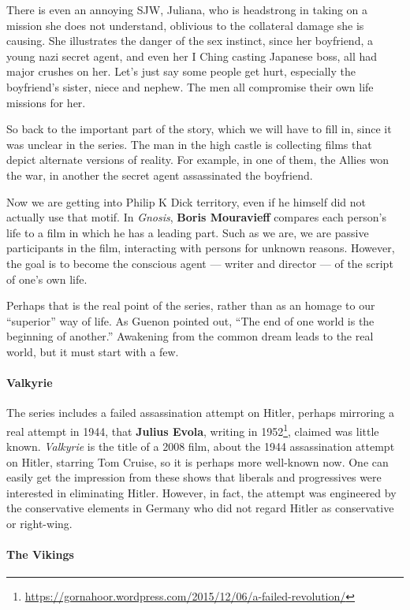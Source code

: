 There is even an annoying SJW, Juliana, who is headstrong in taking on a mission she does not understand, oblivious to the collateral damage she is causing. She illustrates the danger of the sex instinct, since her boyfriend, a young nazi secret agent, and even her I Ching casting Japanese boss, all had major crushes on her. Let's just say some people get hurt, especially the boyfriend's sister, niece and nephew. The men all compromise their own life missions for her.

So back to the important part of the story, which we will have to fill in, since it was unclear in the series. The man in the high castle is collecting films that depict alternate versions of reality. For example, in one of them, the Allies won the war, in another the secret agent assassinated the boyfriend.

Now we are getting into Philip K Dick territory, even if he himself did not actually use that motif. In \emph{Gnosis}, \textbf{Boris Mouravieff} compares each person's life to a film in which he has a leading part. Such as we are, we are passive participants in the film, interacting with persons for unknown reasons. However, the goal is to become the conscious agent --- writer and director --- of the script of one's own life.

Perhaps that is the real point of the series, rather than as an homage to our ``superior'' way of life. As Guenon pointed out, ``The end of one world is the beginning of another.'' Awakening from the common dream leads to the real world, but it must start with a few.

\paragraph{Valkyrie}


The series includes a failed assassination attempt on Hitler, perhaps mirroring a real attempt in 1944, that \textbf{Julius Evola}, writing in 1952\footnote{\url{https://gornahoor.wordpress.com/2015/12/06/a-failed-revolution/}}, claimed was little known. \emph{Valkyrie} is the title of a 2008 film, about the 1944 assassination attempt on Hitler, starring Tom Cruise, so it is perhaps more well-known now. One can easily get the impression from these shows that liberals and progressives were interested in eliminating Hitler. However, in fact, the attempt was engineered by the conservative elements in Germany who did not regard Hitler as conservative or right-wing.

\paragraph{The Vikings}


